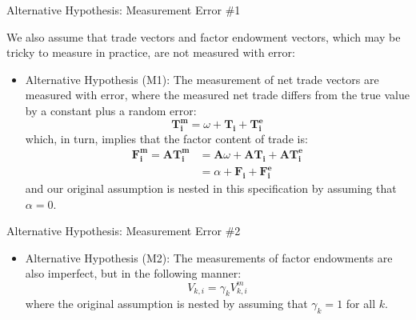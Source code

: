 \documentclass[aspectratio=169]{beamer}
\begin{document}
\begin{frame}{Alternative Hypothesis:  Measurement Error \#1}

We also assume that trade vectors and factor endowment vectors, which may be tricky to measure in practice, are not measured with error:

\begin{itemize}
    \item<1-> Alternative Hypothesis (M1):  The measurement of net trade vectors are measured with error, where the measured net trade differs from the true value by a constant plus a random error:
    \begin{equation*}
        \mathbf{T_{i}^{m}} = \omega + \mathbf{T_{i}} + \mathbf{T_{i}^{e}}
    \end{equation*}
    which, in turn, implies that the factor content of trade is:
    \begin{equation*}
         \begin{split}
            \mathbf{F_{i}^{m}} = \mathbf{AT_{i}^{m}} &= \mathbf{A}\omega + \mathbf{AT_{i}} + \mathbf{AT_{i}^{e}} \\ &= \alpha + \mathbf{F_{i}} + \mathbf{F_{i}^{e}}
        \end{split}
    \end{equation*}
   and our original assumption is nested in this specification by assuming that $ \alpha = 0 $.
\end{itemize}
    
\end{frame}


\begin{frame}{Alternative Hypothesis:  Measurement Error \#2}

\begin{itemize}
    \item<1-> Alternative Hypothesis (M2):  The measurements of factor endowments are also imperfect, but in the following manner:
    \begin{equation*}
        V_{k,i} = \gamma_{k}V_{k,i}^{m}
    \end{equation*}
    where the original assumption is nested by assuming that $ \gamma_{k} = 1 $ for all $ k $.
\end{itemize}
    
\end{frame}

\end{document}
